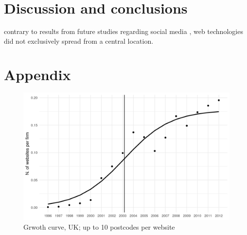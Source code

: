 \documentclass[
  authoryear,
  preprint,
  3p]{elsarticle}
\begin{document}
\section{Discussion and conclusions}\label{sec-conclusions}

contrary to results from future studies regarding social media
\citep{lengyel2020role}, web technologies did not exclusively spread
from a central location.

\setcounter{section}{0}
\renewcommand{\thesection}{\Alph{section}}

\setcounter{table}{0}
\renewcommand{\thetable}{A\arabic{table}}

\setcounter{figure}{0}
\renewcommand{\thefigure}{A\arabic{figure}}

\section{Appendix}\label{appendix}


\begin{figure}[H]

{\centering \includegraphics[width=1\textwidth,height=\textheight]{../../outputs/s/s_uk_per_firm.png}

}

\caption{\label{s_uk10}Grwoth curve, UK; up to 10 postcodes per website}

\end{figure}%
\end{document}
